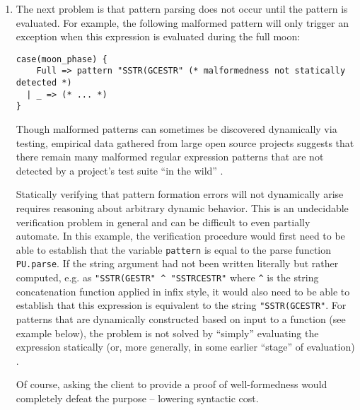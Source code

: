\begin{enumerate}
\item The next problem is that pattern parsing does not occur until the pattern is evaluated. For example, the following malformed pattern will only trigger an exception when this expression is evaluated during the full moon: %

\begin{lstlisting}[numbers=none]
case(moon_phase) {
    Full => pattern "SSTR(GCESTR" (* malformedness not statically detected *)
  | _ => (* ... *)
}
\end{lstlisting}
Though malformed patterns can sometimes be discovered dynamically via testing, empirical data gathered from large open source projects suggests that there remain many malformed regular expression patterns that are not detected by a project's test suite ``in the wild'' \cite{spishak2012type}. 

Statically verifying that pattern formation errors will not dynamically arise requires reasoning about arbitrary dynamic behavior. This is an undecidable verification problem in general and can be difficult to even partially automate. In this example, the verification procedure would first need to be able to establish that the variable \lstinline{pattern} is equal to the parse function \lstinline{PU.parse}. If the string argument had not been written literally but rather computed, e.g. as \lstinline{"SSTR(GESTR" ^ "SSTRCESTR"} where \lstinline{^} is the string concatenation function applied in infix style, it would also need to be able to establish that this expression is equivalent to the string \lstinline{"SSTR(GCESTR"}. For patterns that are dynamically constructed based on input to a function (see example below), the problem is not solved by ``simply''  evaluating the expression statically (or, more generally, in some earlier ``stage'' of evaluation) \cite{Jones:Gomard:Sestoft:93:PartialEvaluation}. 

Of course, asking the client to provide a proof of well-formedness would completely defeat the purpose -- lowering syntactic cost.


\end{enumerate}
